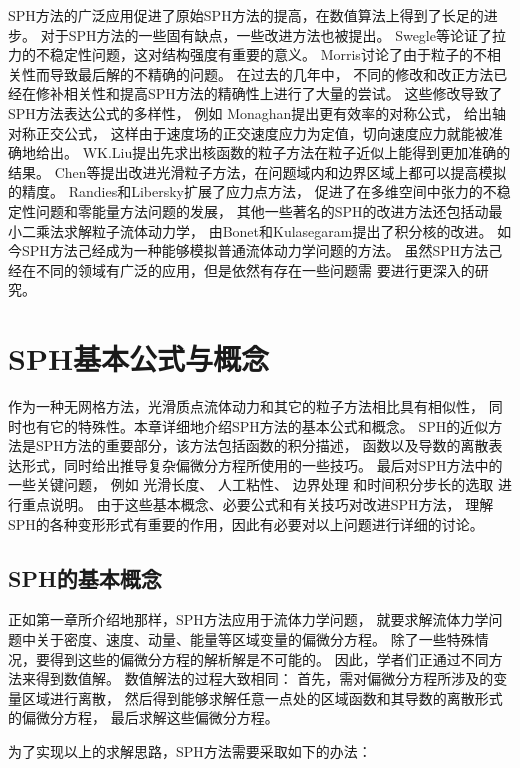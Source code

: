 SPH方法的广泛应用促进了原始SPH方法的提高，在数值算法上得到了长足的进步。
对于SPH方法的一些固有缺点，一些改进方法也被提出。
Swegle等论证了拉力的不稳定性问题，这对结构强度有重要的意义。
Morris讨论了由于粒子的不相关性而导致最后解的不精确的问题。
在过去的几年中，
不同的修改和改正方法已经在修补相关性和提高SPH方法的精确性上进行了大量的尝试。
这些修改导致了SPH方法表达公式的多样性，
例如
Monaghan提出更有效率的对称公式，
\citeauthor{Johnson1996NORMALIZED}
给出轴对称正交公式，
这样由于速度场的正交速度应力为定值，切向速度应力就能被准确地给出。
WK.Liu提出先求出核函数的粒子方法在粒子近似上能得到更加准确的结果。
Chen等提出改进光滑粒子方法，在问题域内和边界区域上都可以提高模拟的精度。
Randies和Libersky扩展了应力点方法，
促进了在多维空间中张力的不稳定性问题和零能量方法问题的发展， 
其他一些著名的SPH的改进方法还包括动最小二乘法求解粒子流体动力学，
由Bonet和Kulasegaram提出了积分核的改进。
如今SPH方法己经成为一种能够模拟普通流体动力学问题的方法。
虽然SPH方法己经在不同的领域有广泛的应用，但是依然有存在一些问题需
要进行更深入的研究。

\chapter{SPH基本公式与概念}

\qquad{}作为一种无网格方法，光滑质点流体动力和其它的粒子方法相比具有相似性，
同时也有它的特殊性。本章详细地介绍SPH方法的基本公式和概念。
SPH的近似方法是SPH方法的重要部分，该方法包括函数的积分描述，
函数以及导数的离散表达形式，同时给出推导复杂偏微分方程所使用的一些技巧。
最后对SPH方法中的一些关键问题，
例如
光滑长度、
人工粘性、
边界处理
和时间积分步长的选取
进行重点说明。
由于这些基本概念、必要公式和有关技巧对改进SPH方法，
理解SPH的各种变形形式有重要的作用，因此有必要对以上问题进行详细的讨论。

\section{SPH的基本概念}
正如第一章所介绍地那样，SPH方法应用于流体力学问题，
就要求解流体力学问题中关于密度、速度、动量、能量等区域变量的偏微分方程。
除了一些特殊情况，要得到这些的偏微分方程的解析解是不可能的。
因此，学者们正通过不同方法来得到数值解。
数值解法的过程大致相同：
首先，需对偏微分方程所涉及的变量区域进行离散，
然后得到能够求解任意一点处的区域函数和其导数的离散形式的偏微分方程，
最后求解这些偏微分方程。

为了实现以上的求解思路，SPH方法需要采取如下的办法：

